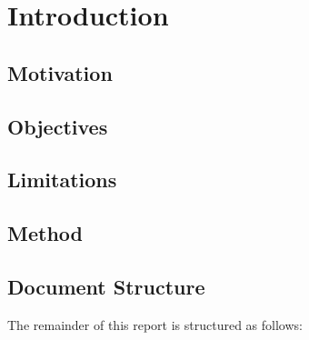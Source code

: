 \chapter{Introduction}\label{introduction}

\section{Motivation}

\section{Objectives}

\section{Limitations}

\section{Method}

\section{Document Structure}
The remainder of this report is structured as follows:
